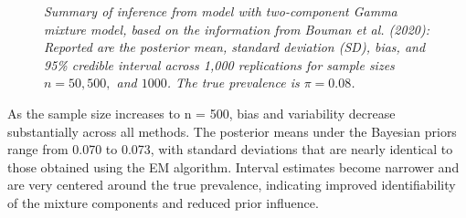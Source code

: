 \documentclass[11pt]{article}
\begin{document}
\begin{figure}[htbp]
	\caption{\em Summary of inference from model with two-component Gamma mixture model, based on the information from Bouman et al. (2020): Reported are the posterior  mean, standard deviation (SD), bias, and 95\% credible interval across 1,000 replications for sample sizes $n = 50, 500,$ and $1000$. The true prevalence is $\pi = 0.08$.}
	\label{posterior1}
\end{figure}

As the sample size increases to n = 500, bias and variability decrease substantially across all methods. The posterior means under the Bayesian priors range from 0.070 to 0.073, with standard deviations that are nearly identical to those obtained using the EM algorithm. Interval estimates become narrower and are very centered around the true prevalence, indicating improved identifiability of the mixture components and reduced prior influence. 
\end{document}
